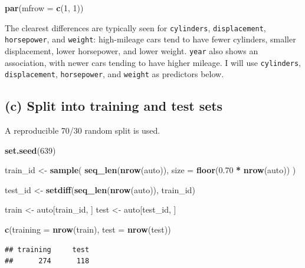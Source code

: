 \documentclass[
]{article}
\newenvironment{Shaded}{\begin{snugshade}}{\end{snugshade}}
\newcommand{\AttributeTok}[1]{\textcolor[rgb]{0.13,0.29,0.53}{#1}}
\newcommand{\DecValTok}[1]{\textcolor[rgb]{0.00,0.00,0.81}{#1}}
\newcommand{\FloatTok}[1]{\textcolor[rgb]{0.00,0.00,0.81}{#1}}
\newcommand{\FunctionTok}[1]{\textcolor[rgb]{0.13,0.29,0.53}{\textbf{#1}}}
\newcommand{\NormalTok}[1]{#1}
\newcommand{\OtherTok}[1]{\textcolor[rgb]{0.56,0.35,0.01}{#1}}
\newcommand{\SpecialCharTok}[1]{\textcolor[rgb]{0.81,0.36,0.00}{\textbf{#1}}}
\begin{document}
\begin{Shaded}
\begin{Highlighting}[]
\FunctionTok{par}\NormalTok{(}\AttributeTok{mfrow =} \FunctionTok{c}\NormalTok{(}\DecValTok{1}\NormalTok{, }\DecValTok{1}\NormalTok{))}
\end{Highlighting}
\end{Shaded}

The clearest differences are typically seen for \texttt{cylinders},
\texttt{displacement}, \texttt{horsepower}, and \texttt{weight}:
high-mileage cars tend to have fewer cylinders, smaller displacement,
lower horsepower, and lower weight. \texttt{year} also shows an
association, with newer cars tending to have higher mileage. I will use
\texttt{cylinders}, \texttt{displacement}, \texttt{horsepower}, and
\texttt{weight} as predictors below.

\subsection{(c) Split into training and test
sets}\label{c-split-into-training-and-test-sets}

A reproducible 70/30 random split is used.

\begin{Shaded}
\begin{Highlighting}[]
\FunctionTok{set.seed}\NormalTok{(}\DecValTok{639}\NormalTok{)}

\NormalTok{train\_id }\OtherTok{\textless{}{-}} \FunctionTok{sample}\NormalTok{(}
  \FunctionTok{seq\_len}\NormalTok{(}\FunctionTok{nrow}\NormalTok{(auto)),}
  \AttributeTok{size =} \FunctionTok{floor}\NormalTok{(}\FloatTok{0.70} \SpecialCharTok{*} \FunctionTok{nrow}\NormalTok{(auto))}
\NormalTok{)}

\NormalTok{test\_id }\OtherTok{\textless{}{-}} \FunctionTok{setdiff}\NormalTok{(}\FunctionTok{seq\_len}\NormalTok{(}\FunctionTok{nrow}\NormalTok{(auto)), train\_id)}

\NormalTok{train }\OtherTok{\textless{}{-}}\NormalTok{ auto[train\_id, ]}
\NormalTok{test }\OtherTok{\textless{}{-}}\NormalTok{ auto[test\_id, ]}

\FunctionTok{c}\NormalTok{(}\AttributeTok{training =} \FunctionTok{nrow}\NormalTok{(train), }\AttributeTok{test =} \FunctionTok{nrow}\NormalTok{(test))}
\end{Highlighting}
\end{Shaded}

\begin{verbatim}
## training     test 
##      274      118
\end{verbatim}
\end{document}

